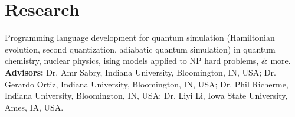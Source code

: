 \section{Research}
Programming language development for quantum simulation (Hamiltonian evolution, second quantization, adiabatic quantum simulation) in quantum chemistry, nuclear physics, ising models applied to NP hard problems, \& more. \\
\textbf{Advisors:} Dr. Amr Sabry, Indiana University, Bloomington, IN, USA; Dr. Gerardo Ortiz, Indiana University, Bloomington, IN, USA; Dr. Phil Richerme, Indiana University, Bloomington, IN, USA; Dr. Liyi Li, Iowa State University, Ames, IA, USA. \\
